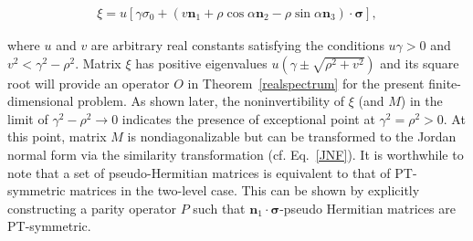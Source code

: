 \documentclass{tADP2e}
\theoremstyle{plain}
\newcommand{\eqn}[1]{
\begin{eqnarray}
	#1
\end{eqnarray}
}
\theoremstyle{plain}
\theoremstyle{definition}
\begin{document}
{\eqn{
\xi=u\left[\gamma\sigma_0+(v{\boldsymbol n}_1+\rho\cos\alpha{\boldsymbol n}_2-\rho\sin\alpha{\boldsymbol n}_3)\cdot{\boldsymbol \sigma}\right],
}
where $u$ and $v$ are arbitrary real constants satisfying the conditions $u\gamma>0$ and $v^2<\gamma^2-\rho^2$. Matrix $\xi$ has positive eigenvalues $u(\gamma\pm\sqrt{\rho^2+v^2})$ and its square root will provide an operator $O$ in Theorem~\ref{realspectrum} for the present finite-dimensional problem. As shown later, the noninvertibility of $\xi$ (and $M$) in the limit of $\gamma^2-\rho^2\to 0$ indicates the presence of exceptional point at $\gamma^2=\rho^2>0$. At this point, matrix $M$ is nondiagonalizable but can be transformed to the Jordan normal form  via the similarity transformation (cf.  Eq.~\eqref{JNF}).
It is worthwhile to note that a set of pseudo-Hermitian matrices is equivalent to that of PT-symmetric matrices in the two-level case. This can be shown by explicitly 
constructing a parity operator $P$ such that ${\boldsymbol n}_1\cdot{\boldsymbol \sigma}$-pseudo Hermitian matrices are PT-symmetric.
}
\end{document}
